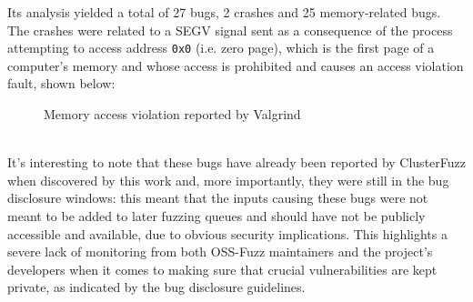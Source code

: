 Its analysis yielded a total of 27 bugs, 2 crashes and 25 memory-related bugs.
The crashes were related to a SEGV signal sent as a consequence of the process attempting to access address \verb|0x0| (i.e. zero page), which is the first page of a computer's memory and whose access is prohibited and causes an access violation fault, shown below:
\begin{figure}[h]
\caption{Memory access violation reported by Valgrind }
\label{fig:segv_gpac}
\end{figure}
\ \\
It's interesting to note that these bugs have already been reported by ClusterFuzz when discovered by this work and, more importantly, they were still in the bug disclosure windows: this meant that the inputs causing these bugs were not meant to be added to later fuzzing queues and should have not be publicly accessible and available, due to obvious security implications. This highlights a severe lack of monitoring from both OSS-Fuzz maintainers and the project's developers when it comes to making sure that crucial vulnerabilities are kept private, as indicated by the bug disclosure guidelines. 

